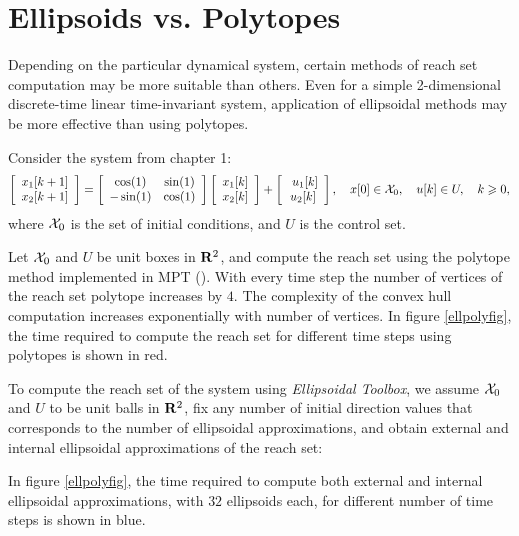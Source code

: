 \section{Ellipsoids vs. Polytopes}
Depending on the particular dynamical system, certain methods of
reach set computation may be more suitable than others.
Even for a simple 2-dimensional discrete-time linear time-invariant
system, application of ellipsoidal methods may be more effective
than using polytopes.

Consider the system from chapter 1:
\[ \left[\begin{array}{c}
x_1[k+1]\\
x_2[k+1]\end{array}\right] = \left[\begin{array}{cc}
\cos(1) & \sin(1)\\
-\sin(1) & \cos(1)\end{array}\right]\left[\begin{array}{c}
x_1[k]\\
x_2[k]\end{array}\right] + \left[\begin{array}{c}\
u_1[k]\\
u_2[k]\end{array}\right], ~~~ x[0]\in\XX_0, ~~~ u[k]\in U, ~~~ k\geq0, \]
where $\XX_0$ is the set of initial conditions, and $U$ is the control set.

Let $\XX_0$ and $U$ be unit boxes in ${\bf R}^2$, and compute the reach set
using the polytope method implemented in MPT (\cite{mpt}). With every time step
the number of vertices of the reach set polytope increases by $4$.
The complexity of the
convex hull computation increases exponentially with number of vertices.
In figure \ref{ellpolyfig}, the time required to compute the reach set
for different time steps using polytopes is shown in red.

To compute the reach set of the system using {\it Ellipsoidal Toolbox},
we assume $\XX_0$ and $U$ to be unit balls in ${\bf R}^2$, fix any number
of initial direction values that corresponds to the number of ellipsoidal
approximations, and obtain external and internal ellipsoidal approximations
of the reach set:

In figure \ref{ellpolyfig}, the time required to compute both external
and internal ellipsoidal approximations, with $32$ ellipsoids each,
for different number of time steps is shown in blue.

